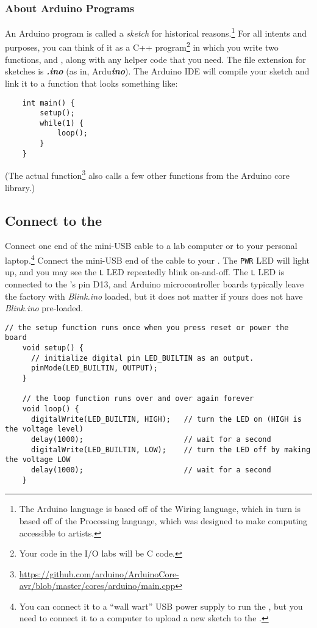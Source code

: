\subsubsection*{About Arduino Programs}

    An Arduino program is called a \textit{sketch} for historical reasons.\footnote{The Arduino language is based off of the Wiring language, which in turn is based off of the Processing language, which was designed to make computing accessible to artists.}
    For all intents and purposes, you can think of it as a C++ program\footnote{Your code in the I/O labs will be C code.} in which you write two functions,  and , along with any helper code that you need.
    The file extension for sketches is \textbf{\textit{.ino}} (as in, Ardu\textbf{\textit{ino}}).
    The Arduino IDE will compile your sketch and link it to a  function that looks something like:
    \begin{lstlisting}
    int main() {
        setup();
        while(1) {
            loop();
        }
    }
    \end{lstlisting}
    (The actual  function\footnote{\url{https://github.com/arduino/ArduinoCore-avr/blob/master/cores/arduino/main.cpp}} also calls a few other functions from the Arduino core library.)

\subsection{Connect to the \developmentboard}

    Connect one end of the mini-USB cable to a lab computer or to your personal laptop.\footnote{You can connect it to a ``wall wart'' USB power supply to run the \developmentboard, but you need to connect it to a computer to upload a new sketch to the \developmentboard.}
    Connect the mini-USB end of the cable to your \developmentboard.
    The \texttt{PWR} LED will light up, and you may see the \texttt{L} LED repeatedly blink on-and-off.
    The \texttt{L} LED is connected to the \developmentboard's pin D13, and Arduino microcontroller boards typically leave the factory with \textit{Blink.ino} loaded, but it does not matter if yours does not have \textit{Blink.ino} pre-loaded.

    \begin{lstlisting}[basicstyle=\ttfamily\footnotesize]
    // the setup function runs once when you press reset or power the board
    void setup() {
      // initialize digital pin LED_BUILTIN as an output.
      pinMode(LED_BUILTIN, OUTPUT);
    }

    // the loop function runs over and over again forever
    void loop() {
      digitalWrite(LED_BUILTIN, HIGH);   // turn the LED on (HIGH is the voltage level)
      delay(1000);                       // wait for a second
      digitalWrite(LED_BUILTIN, LOW);    // turn the LED off by making the voltage LOW
      delay(1000);                       // wait for a second
    }
    \end{lstlisting}

